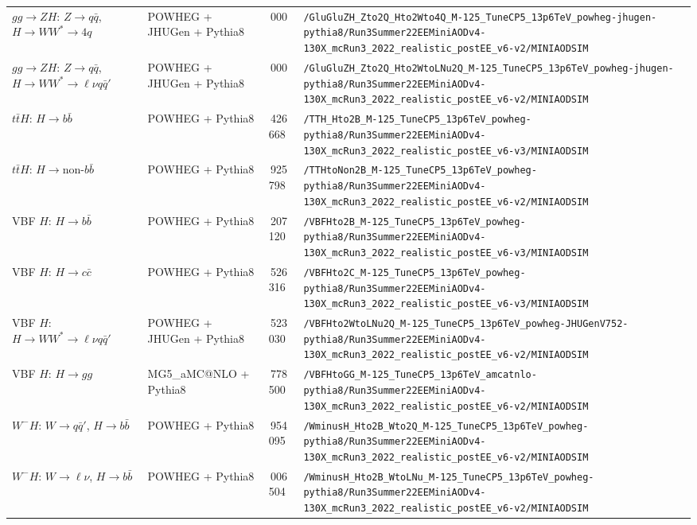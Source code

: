 \begin{landscape}
\begin{longtable}{@{}>{\raggedright\arraybackslash}p{3.2cm}>{\raggedright\arraybackslash}p{3.6cm}>{\raggedleft\arraybackslash}p{1.6cm}>{\raggedright\arraybackslash}p{13.5cm}@{}}
$gg\to ZH$: $Z\to q\bar q$, $H\to WW^*\to 4q$ & POWHEG + JHUGen + Pythia8 & 988\,000 & \nolinkurl{/GluGluZH_Zto2Q_Hto2Wto4Q_M-125_TuneCP5_13p6TeV_powheg-jhugen-pythia8/Run3Summer22EEMiniAODv4-130X_mcRun3_2022_realistic_postEE_v6-v2/MINIAODSIM} \\
$gg\to ZH$: $Z\to q\bar q$, $H\to WW^*\to\ell\nu q\bar q'$ & POWHEG + JHUGen + Pythia8 & 998\,000 & \nolinkurl{/GluGluZH_Zto2Q_Hto2WtoLNu2Q_M-125_TuneCP5_13p6TeV_powheg-jhugen-pythia8/Run3Summer22EEMiniAODv4-130X_mcRun3_2022_realistic_postEE_v6-v2/MINIAODSIM} \\
$t\bar tH$: $H\to b\bar b$ & POWHEG + Pythia8 & 10\,426\,668 & \nolinkurl{/TTH_Hto2B_M-125_TuneCP5_13p6TeV_powheg-pythia8/Run3Summer22EEMiniAODv4-130X_mcRun3_2022_realistic_postEE_v6-v3/MINIAODSIM} \\
$t\bar tH$: $H\to \textrm{non-}b\bar b$ & POWHEG + Pythia8 & 13\,925\,798 & \nolinkurl{/TTHtoNon2B_M-125_TuneCP5_13p6TeV_powheg-pythia8/Run3Summer22EEMiniAODv4-130X_mcRun3_2022_realistic_postEE_v6-v2/MINIAODSIM} \\
VBF $H$: $H\to b\bar b$ & POWHEG + Pythia8 & 12\,207\,120 & \nolinkurl{/VBFHto2B_M-125_TuneCP5_13p6TeV_powheg-pythia8/Run3Summer22EEMiniAODv4-130X_mcRun3_2022_realistic_postEE_v6-v3/MINIAODSIM} \\
VBF $H$: $H\to c\bar c$ & POWHEG + Pythia8 & 15\,526\,316 & \nolinkurl{/VBFHto2C_M-125_TuneCP5_13p6TeV_powheg-pythia8/Run3Summer22EEMiniAODv4-130X_mcRun3_2022_realistic_postEE_v6-v3/MINIAODSIM} \\
VBF $H$: $H\to WW^*\to\ell\nu q\bar q'$ & POWHEG + JHUGen + Pythia8 & 1\,523\,030 & \nolinkurl{/VBFHto2WtoLNu2Q_M-125_TuneCP5_13p6TeV_powheg-JHUGenV752-pythia8/Run3Summer22EEMiniAODv4-130X_mcRun3_2022_realistic_postEE_v6-v2/MINIAODSIM} \\
VBF $H$: $H\to gg$ & MG5\_aMC@NLO + Pythia8 & 1\,778\,500 & \nolinkurl{/VBFHtoGG_M-125_TuneCP5_13p6TeV_amcatnlo-pythia8/Run3Summer22EEMiniAODv4-130X_mcRun3_2022_realistic_postEE_v6-v2/MINIAODSIM} \\
$W^-H$: $W\to q\bar q'$, $H\to b\bar b$ & POWHEG + Pythia8 & 3\,954\,095 & \nolinkurl{/WminusH_Hto2B_Wto2Q_M-125_TuneCP5_13p6TeV_powheg-pythia8/Run3Summer22EEMiniAODv4-130X_mcRun3_2022_realistic_postEE_v6-v2/MINIAODSIM} \\
$W^-H$: $W\to \ell\nu$, $H\to b\bar b$ & POWHEG + Pythia8 & 2\,006\,504 & \nolinkurl{/WminusH_Hto2B_WtoLNu_M-125_TuneCP5_13p6TeV_powheg-pythia8/Run3Summer22EEMiniAODv4-130X_mcRun3_2022_realistic_postEE_v6-v2/MINIAODSIM} \\

\end{longtable}
\end{landscape}
